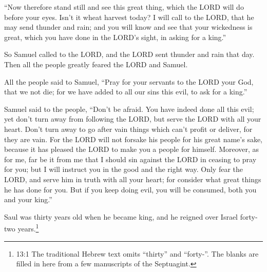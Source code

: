\myverse{}“Now therefore stand still and see this great thing, which the
LORD will do before your eyes.
\myverse{}Isn’t it wheat harvest today? I will call to the LORD, that he may send thunder
and rain; and you will know and see that your wickedness is great, which you have done in the LORD’s sight,
in asking for a king.”

\myverse{}So Samuel called to the LORD, and the LORD sent thunder and
rain that day. Then all the people greatly feared the LORD and Samuel.

\myverse{}All the people said to Samuel, “Pray for your servants to the
LORD your God, that we not die; for we have added to all our sins this evil, to ask for a king.”

\myverse{}Samuel said to the people, “Don’t be afraid. You have indeed
done all this evil; yet don’t turn away from following the LORD, but serve the LORD with all your heart.
\myverse{}Don’t turn away to go after vain things which can’t profit or deliver, for
they are vain.
\myverse{}For the LORD will not forsake his people for his great name’s sake, because
it has pleased the LORD to make you a people for himself.
\myverse{}Moreover, as for me, far be it from me that I should sin against the LORD
in ceasing to pray for you; but I will instruct you in the good and the right way.
\myverse{}Only fear the LORD, and serve him in truth with all your heart; for consider
what great things he has done for you.
\myverse{}But if you keep doing evil, you will be consumed, both you and your king.”


\mychapter{} \myverse*{}Saul was thirty years old when he became king, and he reigned
over Israel forty-two years.\footnote{13:1 The traditional Hebrew text omits “thirty” and “forty-”. The blanks are filled in here from a
	few manuscripts of the Septuagint.}

